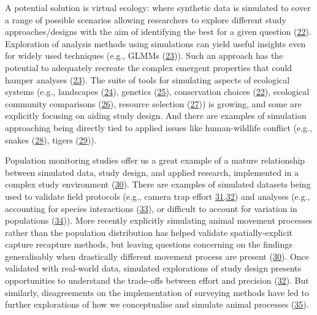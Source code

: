 \documentclass[10pt,a4paper]{article}
\begin{document}
A potential solution is virtual ecology: where synthetic data is simulated to cover a range of possible scenarios allowing researchers to explore different study approaches/designs with the aim of identifying the best for a given question (\protect\hyperlink{ref-gupta_reserve_2019}{22}).
Exploration of analysis methods using simulations can yield useful insights even for widely used techniques (e.g., GLMMs (\protect\hyperlink{ref-debruine_understanding_2021}{23})).
Such an approach has the potential to adequately recreate the complex emergent properties that could hamper analyses (\protect\hyperlink{ref-debruine_understanding_2021}{23}).
The suite of tools for simulating aspects of ecological systems (e.g., landscapes (\protect\hyperlink{ref-Sciaini2018}{24}), genetics (\protect\hyperlink{ref-petr_slendr_2022}{25}), conservation choices (\protect\hyperlink{ref-gupta_reserve_2019}{22}), ecological community comparisons (\protect\hyperlink{ref-guerracastro_ssp_2021}{26}), resource selection (\protect\hyperlink{ref-street_solving_2021}{27})) is growing, and some are explicitly focusing on aiding study design.
And there are examples of simulation approaching being directly tied to applied issues like human-wildlife conflict (e.g., snakes (\protect\hyperlink{ref-goldstein_integrating_2021}{28}), tigers (\protect\hyperlink{ref-Ahearn2001}{29})).

Population monitoring studies offer us a great example of a mature relationship between simulated data, study design, and applied research, implemented in a complex study environment (\protect\hyperlink{ref-theng_confronting_2022}{30}).
There are examples of simulated datasets being used to validate field protocols (e.g., camera trap effort \protect\hyperlink{ref-howe_distance_2017}{31},\protect\hyperlink{ref-cappelle_estimating_2021}{32}) and analyses (e.g., accounting for species interactions (\protect\hyperlink{ref-kellner_two-species_2022}{33}), or difficult to account for variation in populations (\protect\hyperlink{ref-milleret_estimating_2022}{34})).
More recently explicitly simulating animal movement processes rather than the population distribution has helped validate spatially-explicit capture recapture methods, but leaving questions concerning on the findings generalisably when drastically different movement process are present (\protect\hyperlink{ref-theng_confronting_2022}{30}).
Once validated with real-world data, simulated explorations of study design presents opportunities to understand the trade-offs between effort and precision (\protect\hyperlink{ref-cappelle_estimating_2021}{32}).
But similarly, disagreements on the implementation of surveying methods have led to further explorations of how we conceptualise and simulate animal processes (\protect\hyperlink{ref-abolaffio_avoiding_2019}{35}).
\end{document}
